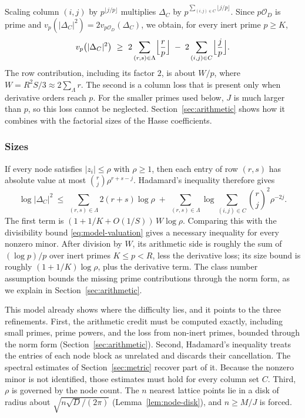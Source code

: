 Scaling column $(i,j)$ by $p^{\lfloor j/p\rfloor}$ multiplies $\Delta_C$ by
$p^{\sum_{(i,j)\in C}\lfloor j/p\rfloor}$. Since $p\mathcal{O}_D$ is prime and
$v_p(|\Delta_C|^2)=2v_{p\mathcal{O}_D}(\Delta_C)$, we obtain, for every inert
prime $p\geq K$,
\begin{equation}\label{eq:model-valuation}
  v_p\bigl(|\Delta_C|^2\bigr)\ \ge\
  2\sum_{(r,s)\in\Lambda}\Bigl\lfloor\frac rp\Bigr\rfloor
  \;-\;2\sum_{(i,j)\in C}\Bigl\lfloor\frac jp\Bigr\rfloor .
\end{equation}
The row contribution, including its factor $2$, is about $W/p$, where
$W=R^2S/3\approx2\sum_\Lambda r$. The second is a column loss that is present
only when derivative orders reach $p$. For the smaller primes used below, $J$ is much larger than $p$, so this
loss cannot be neglected. Section~\ref{sec:arithmetic} shows how it
combines with the factorial sizes of the Hasse coefficients.

\subsubsection*{Sizes}
If every node satisfies $|z_i|\le\rho$ with $\rho\ge1$, then each entry
of row $(r,s)$ has absolute value at most $\binom rj\rho^{r+s-j}$. Hadamard's
inequality therefore gives
\begin{equation}\label{eq:model-hadamard}
  \log|\Delta_C|^2\ \le\ \sum_{(r,s)\in\Lambda}2(r+s)\log\rho
  \;+\;\sum_{(r,s)\in\Lambda}\log\sum_{(i,j)\in C}\binom rj^2\rho^{-2j}.
\end{equation}
The first term is $(1+1/K+O(1/S))\,W\log\rho$. Comparing this with the divisibility bound
\eqref{eq:model-valuation} gives a necessary inequality for every nonzero
minor. After division by $W$, its arithmetic side is roughly the sum of
$(\log p)/p$ over inert primes $K\leq p<R$, less the derivative loss;
its size bound is roughly $(1+1/K)\log\rho$, plus the derivative term.
The class number assumption bounds the missing prime contributions through
the norm form, as we explain in Section~\ref{sec:arithmetic}.

This model already shows where the difficulty lies, and it points to the three
refinements. First, the arithmetic credit must be computed exactly, including
small primes, prime powers, and the loss from non-inert primes, bounded through
the norm form (Section~\ref{sec:arithmetic}). Second, Hadamard's inequality treats the
entries of each node block as unrelated and discards their cancellation. The
spectral estimates of Section~\ref{sec:metric} recover part of it. Because the
nonzero minor is not identified, those estimates must hold for every column set
$C$. Third, $\rho$ is governed by the node count. The $n$ nearest lattice points
lie in a disk of radius about $\sqrt{n\sqrt D/(2\pi)}$
(Lemma~\ref{lem:node-disk}), and $n\ge M/J$ is forced.

